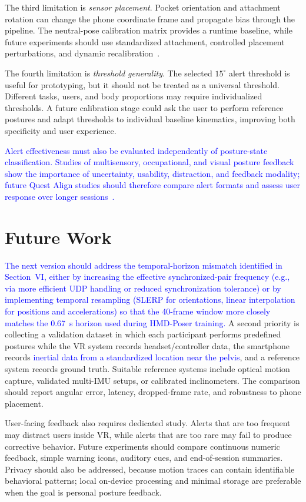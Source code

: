 \documentclass[conference]{IEEEtran}
\newcommand{\CC}[1]{\textcolor{blue}{#1}}
\begin{document}
The third limitation is \textit{sensor placement}. Pocket orientation and attachment
rotation can change the phone coordinate frame and propagate bias through the pipeline.
The neutral-pose calibration matrix provides a runtime baseline, while future experiments should use
standardized attachment, controlled placement perturbations, and dynamic
recalibration~\cite{transformer_imu_calibrator,potter_alignment,imucoco}.

The fourth limitation is \textit{threshold generality}. The selected $15^{\circ}$ alert
threshold is useful for prototyping, but it should not be treated as a universal
threshold. Different tasks, users, and body proportions may require individualized
thresholds. A future calibration stage could ask the user to perform reference postures and
adapt thresholds to individual baseline kinematics, improving both specificity and user
experience.

\CC{Alert effectiveness must also be evaluated independently of posture-state
classification. Studies of multisensory, occupational, and visual posture feedback show the
importance of uncertainty, usability, distraction, and feedback modality; future Quest
Align studies should therefore compare alert formats and assess user response over longer
sessions~\cite{smartphone_torso_feedback,ergai,offistretch}.}

\section{Future Work}
\CC{The next version should address the temporal-horizon mismatch identified in Section~VI,
either by increasing the effective synchronized-pair frequency (e.g., via more efficient UDP
handling or reduced synchronization tolerance) or by implementing temporal resampling
(SLERP for orientations, linear interpolation for positions and accelerations) so that the
40-frame window more closely matches the 0.67~s horizon used during HMD-Poser training.}
A second priority is collecting a validation dataset in which each participant
performs predefined postures while the VR system records headset/controller data, the
smartphone records \CC{inertial data from a standardized location near the pelvis}, and a reference system records ground truth. Suitable
reference systems include optical motion capture, validated multi-IMU setups, or calibrated
inclinometers. The comparison should report angular error, latency, dropped-frame rate, and
robustness to phone placement.

User-facing feedback also requires dedicated study. Alerts that are too frequent may
distract users inside VR, while alerts that are too rare may fail to produce corrective
behavior. Future experiments should compare continuous numeric feedback, simple warning
icons, auditory cues, and end-of-session summaries. Privacy should also be addressed,
because motion traces can contain identifiable behavioral patterns; local on-device
processing and minimal storage are preferable when the goal is personal posture feedback.
\end{document}
